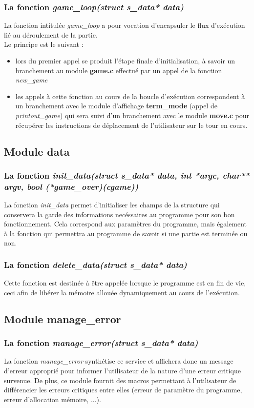 \documentclass{report}
\begin{document}
\subsubsection*{La fonction \textit{game\_loop(struct s\_data* data)}}
La fonction intitulée \textit{game\_loop} a pour vocation d'encapsuler le flux d'exécution lié au déroulement de la partie.\\
Le principe est le suivant :
\begin{itemize}
\item lors du premier appel se produit l'étape finale d'initialisation, à savoir un branchement au module \textbf{game.c} effectué par un appel de la fonction \textit{new\_game}
\item les appels à cette fonction au cours de la boucle d'exécution correspondent à un branchement avec le module d'affichage \textbf{term\_mode} (appel de \textit{printout\_game}) qui sera suivi d'un branchement avec le module \textbf{move.c} pour récupérer les instructions de déplacement de l'utilisateur sur le tour en cours.
\end{itemize}

\subsection{Module data}
\subsubsection*{La fonction \textit{init\_data(struct s\_data* data, int *argc, char** argv, bool (*game\_over)(cgame))}}
La fonction \textit{init\_data} permet d'initialiser les champs de la structure qui conservera la garde des informations necéssaires au programme pour son bon fonctionnement.
Cela correspond aux paramètres du programme, mais également à la fonction qui permettra au programme de savoir si une partie est terminée ou non.
\subsubsection*{La fonction \textit{delete\_data(struct s\_data* data)}}
Cette fonction est destinée à être appelée lorsque le programme est en fin de vie, ceci afin de libérer la mémoire allouée dynamiquement au cours de l'exécution.

\subsection{Module manage\_error}
\subsubsection{La fonction \textit{manage\_error(struct s\_data* data)}}
La fonction \textit{manage\_error} synthétise ce service et affichera donc un message d'erreur approprié pour informer l'utilisateur de la nature d'une erreur critique survenue.
De plus, ce module fournit des macros permettant à l'utilisateur de différencier les erreurs critiques entre elles (erreur de paramètre du programme, erreur d'allocation mémoire, ...).
\end{document}
